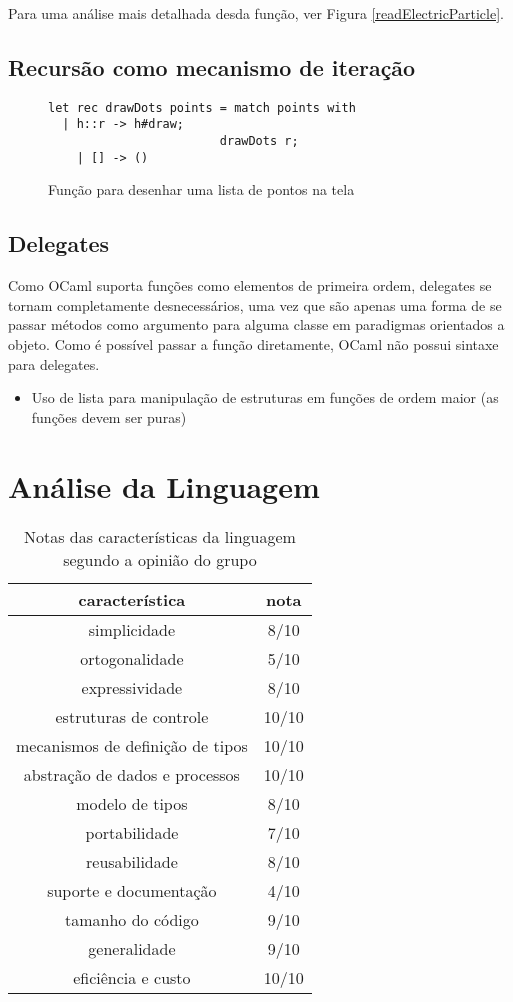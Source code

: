 \documentclass[a4paper,10pt]{article}
\begin{document}
	Para uma análise mais detalhada desda função, ver Figura \ref{readElectricParticle}.

\subsection{Recursão como mecanismo de iteração}

\begin{figure}[H]
	\centering	
	\begin{lstlisting}
let rec drawDots points = match points with
  | h::r -> h#draw;
						drawDots r;
	| [] -> ()
	\end{lstlisting}
	\caption{Função para desenhar uma lista de pontos na tela}
\end{figure}
	
\subsection{Delegates}
	
	Como OCaml suporta funções como elementos de primeira ordem, delegates se tornam completamente desnecessários, uma vez que são apenas uma forma de se passar métodos como argumento para alguma classe em paradigmas orientados a objeto. Como é possível passar a função diretamente, OCaml não possui sintaxe para delegates.
	
\begin{itemize}  
 \item Uso de lista para manipulação de estruturas em funções de ordem maior (as funções devem ser puras) 

\end{itemize}

\section{Análise da Linguagem}

\begin{table}[H]
 \begin{tabular}{c | c}
  \hline
  característica & nota \\
  \hline
  simplicidade & 8/10\\
  ortogonalidade & 5/10\\
  expressividade & 8/10\\  
  estruturas de controle & 10/10\\
  mecanismos de definição de tipos & 10/10\\
  abstração de dados e processos & 10/10\\
  modelo de tipos & 8/10\\
  portabilidade & 7/10\\
  reusabilidade & 8/10\\
  suporte e documentação & 4/10\\
  tamanho do código & 9/10\\
  generalidade & 9/10\\
  eficiência e custo & 10/10\\
  \hline
 \end{tabular}
	\caption{Notas das características da linguagem segundo a opinião do grupo}
\end{table}
\end{document}

